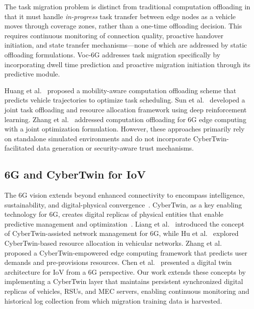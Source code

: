 \documentclass[journal,twoside]{IEEEtran}
\newcommand{\VocSixG}{Voc-6G}
\begin{document}
The task migration problem is distinct from traditional computation offloading in that it must handle \emph{in-progress} task transfer between edge nodes as a vehicle moves through coverage zones, rather than a one-time offloading decision. This requires continuous monitoring of connection quality, proactive handover initiation, and state transfer mechanisms---none of which are addressed by static offloading formulations. \VocSixG{} addresses task migration specifically by incorporating dwell time prediction and proactive migration initiation through its predictive module.

Huang et al.~\cite{huang2021computation} proposed a mobility-aware computation offloading scheme that predicts vehicle trajectories to optimize task scheduling. Sun et al.~\cite{sun2021drl} developed a joint task offloading and resource allocation framework using deep reinforcement learning. Zhang et al.~\cite{ref_offload1} addressed computation offloading for 6G edge computing with a joint optimization formulation. However, these approaches primarily rely on standalone simulated environments and do not incorporate CyberTwin-facilitated data generation or security-aware trust mechanisms.

\subsection{6G and CyberTwin for IoV}

The 6G vision extends beyond enhanced connectivity to encompass intelligence, sustainability, and digital-physical convergence~\cite{zhang20206g, wu2020comprehensive}. CyberTwin, as a key enabling technology for 6G, creates digital replicas of physical entities that enable predictive management and optimization~\cite{liang2022cybertwin}. Liang et al.~\cite{liang2022cybertwin} introduced the concept of CyberTwin-assisted network management for 6G, while Hu et al.~\cite{hu2023cybertwin} explored CyberTwin-based resource allocation in vehicular networks. Zhang et al.~\cite{zhang2022cybertwin} proposed a CyberTwin-empowered edge computing framework that predicts user demands and pre-provisions resources. Chen et al.~\cite{ref_dtIoV} presented a digital twin architecture for IoV from a 6G perspective. Our work extends these concepts by implementing a CyberTwin layer that maintains persistent synchronized digital replicas of vehicles, RSUs, and MEC servers, enabling continuous monitoring and historical log collection from which migration training data is harvested.
\end{document}
